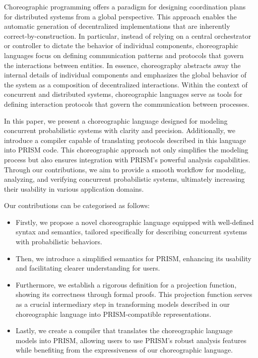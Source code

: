 Choreographic programming offers a paradigm for designing coordination plans for distributed systems from a global perspective. This approach enables the automatic generation of decentralized implementations that are inherently correct-by-construction.
In particular, instead of relying on a central orchestrator or controller to dictate the behavior of individual components, choreographic languages focus on defining communication patterns and protocols that govern the interactions between entities.
In essence, choreography abstracts away the internal details of individual components and emphasizes the global behavior of the system as a composition of decentralized interactions. Within the context of concurrent and distributed systems, choreographic languages serve as tools for defining interaction protocols that govern the communication between processes. 


In this paper, we present a choreographic language designed for modeling concurrent probabilistic systems with clarity and precision. Additionally, we introduce a compiler capable of translating protocols described in this language into PRISM code. This choreographic approach not only simplifies the modeling process but also ensures integration with PRISM's powerful analysis capabilities. Through our contributions, we aim to provide a smooth workflow for modeling, analyzing, and verifying concurrent probabilistic systems, ultimately increasing their usability in various application domains. 

 Our contributions can be categorised as follows: 
\begin{itemize} 
\item Firstly, we propose a novel choreographic language equipped with well-defined syntax and semantics, tailored specifically for describing concurrent systems with probabilistic behaviors. 
\item Then, we introduce a simplified semantics for PRISM, enhancing its usability and facilitating clearer understanding for users.
\item Furthermore, we establish a rigorous definition for a projection function, showing its correctness through formal proofs. This projection function serves as a crucial intermediary step in transforming models described in our choreographic language into PRISM-compatible representations. 
\item Lastly, we create a compiler that translates the choreographic language models into PRISM, allowing users to use PRISM's robust analysis features while benefiting from the expressiveness of our choreographic language.
\end{itemize}



